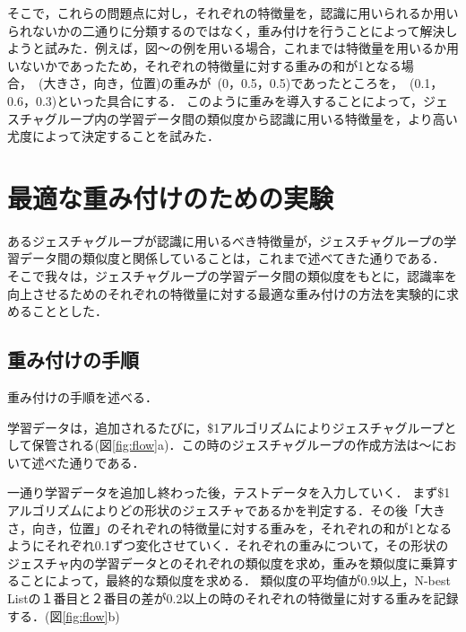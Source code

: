 そこで，これらの問題点に対し，それぞれの特徴量を，認識に用いられるか用いられないかの二通りに分類するのではなく，重み付けを行うことによって解決しようと試みた．例えば，図〜の例を用いる場合，これまでは特徴量を用いるか用いないかであったため，それぞれの特徴量に対する重みの和が1となる場合，~(大きさ，向き，位置)の重みが~(0，0.5，0.5)であったところを，~(0.1，0.6，0.3)といった具合にする．
このように重みを導入することによって，ジェスチャグループ内の学習データ間の類似度から認識に用いる特徴量を，より高い尤度によって決定することを試みた．


\section{最適な重み付けのための実験}
あるジェスチャグループが認識に用いるべき特徴量が，ジェスチャグループの学習データ間の類似度と関係していることは，これまで述べてきた通りである．
そこで我々は，ジェスチャグループの学習データ間の類似度をもとに，認識率を向上させるためのそれぞれの特徴量に対する最適な重み付けの方法を実験的に求めることとした．

\subsection{重み付けの手順}
重み付けの手順を述べる．

学習データは，追加されるたびに，\$1アルゴリズムによりジェスチャグループとして保管される(図\ref{fig:flow}a)．この時のジェスチャグループの作成方法は〜において述べた通りである．

一通り学習データを追加し終わった後，テストデータを入力していく．
まず\$1アルゴリズムによりどの形状のジェスチャであるかを判定する．その後「大きさ，向き，位置」のそれぞれの特徴量に対する重みを，それぞれの和が1となるようにそれぞれ0.1ずつ変化させていく．それぞれの重みについて，その形状のジェスチャ内の学習データとのそれぞれの類似度を求め，重みを類似度に乗算することによって，最終的な類似度を求める．
類似度の平均値が0.9以上，N-best Listの１番目と２番目の差が0.2以上の時のそれぞれの特徴量に対する重みを記録する．(図\ref{fig:flow}b)


